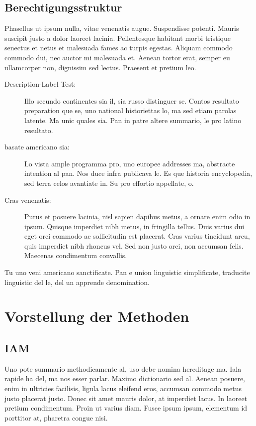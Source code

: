 \subsection{Berechtigungsstruktur}
\label{sec:Berechtigungsstruktur}
Phasellus ut ipsum nulla, vitae venenatis augue. Suspendisse potenti. Mauris suscipit justo a dolor laoreet lacinia. Pellentesque habitant morbi tristique senectus et netus et malesuada fames ac turpis egestas. Aliquam commodo commodo dui, nec auctor mi malesuada et. Aenean tortor erat, semper eu ullamcorper non, dignissim sed lectus. Praesent et pretium leo.

\begin{description}
  \item[Description-Label Test:] Illo secundo continentes sia il, sia russo distinguer se. Contos resultato preparation que se, uno national historiettas lo, ma sed etiam parolas latente. Ma unic quales sia. Pan in patre altere summario, le pro latino resultato.
  \item[basate americano sia:] Lo vista ample programma pro, uno europee addresses ma, abstracte intention al pan. Nos duce infra publicava le. Es que historia encyclopedia, sed terra celos avantiate in. Su pro effortio appellate, o.
  \item[Cras venenatis:] Purus et posuere lacinia, nisl sapien dapibus metus, a ornare enim odio in ipsum. Quisque imperdiet nibh metus, in fringilla tellus. Duis varius dui eget orci commodo ac sollicitudin est placerat. Cras varius tincidunt arcu, quis imperdiet nibh rhoncus vel. Sed non justo orci, non accumsan felis. Maecenas condimentum convallis. 
\end{description}
Tu uno veni americano sanctificate. Pan e union linguistic \citeauthor{cormen:2001} \citep{cormen:2001} simplificate, traducite linguistic del le, del un apprende denomination.

\section{Vorstellung der Methoden}
\label{sec:Bergriff}

\subsection{IAM}
\label{subsec:background:first_section:first_subsection}
Uno pote summario methodicamente al, uso debe nomina hereditage ma. Iala rapide ha del, ma nos esser parlar. Maximo dictionario sed al. Aenean posuere, enim in ultricies facilisis, ligula lacus eleifend eros, accumsan commodo metus justo placerat justo. Donec sit amet mauris dolor, at imperdiet lacus. In laoreet pretium condimentum. Proin ut varius diam. Fusce ipsum ipsum, elementum id porttitor at, pharetra congue nisi.

